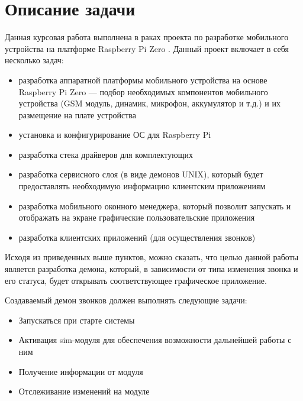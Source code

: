 \section{Описание задачи}
Данная курсовая работа выполнена в раках проекта по разработке мобильного устройства  на платформе Raspberry Pi Zero \cite{RPiZero}. Данный проект включает в себя несколько задач:
\begin{itemize}
\item разработка аппаратной платформы мобильного устройства на основе Raspberry Pi Zero --- подбор необходимых компонентов мобильного устройства (GSM модуль, динамик, микрофон, аккумулятор и т.д.) и их размещение на плате устройства
\item установка и конфигурирование ОС для Raspberry Pi
\item разработка стека драйверов для комплектующих
\item разработка сервисного слоя (в виде демонов UNIX), который будет предоставлять необходимую информацию клиентским приложениям
\item разработка мобильного оконного менеджера, который позволит запускать и отображать на экране графические пользовательские приложения
\item разработка клиентских приложений (для осуществления звонков)
\end{itemize}

Исходя из приведенных выше пунктов, можно сказать, что целью данной работы является разработка демона, который, в зависимости от типа изменения звонка и его статуса, будет открывать соответствующее графическое приложение. 

Создаваемый демон звонков должен выполнять следующие задачи:
\begin{itemize}
\item Запускаться при старте системы
\item Активация sim-модуля для обеспечения возможности дальнейшей работы с ним
\item Получение информации от модуля
\item Отслеживание изменений на модуле
\end{itemize}
